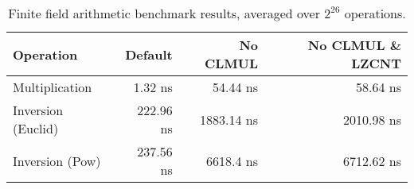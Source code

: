 \begin{table}[hbt]
\centering
\caption{Finite field arithmetic benchmark results, averaged over $2^{26}$ operations.}
\begin{tabular}{lrrr}
\toprule
\textbf{Operation} & \textbf{Default} & \textbf{No CLMUL} & \textbf{No CLMUL \& LZCNT} \\
\midrule
Multiplication     & 1.32 ns & 54.44 ns & 58.64 ns \\
Inversion (Euclid) & 222.96 ns & 1883.14 ns & 2010.98 ns \\
Inversion (Pow)    & 237.56 ns & 6618.4 ns & 6712.62 ns \\
\bottomrule
\end{tabular}
\end{table}
